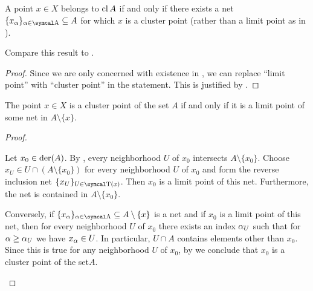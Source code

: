 \begin{proposition}
\begin{corollary}\label{thm:cluster_point_iff_in_closure}
  A point \( x \in X \) belongs to \( \operatorname{cl}{A} \) if and only if there exists a net \( \{ x_\al \}_{\al \in \CA} \subseteq A \) for which \( x \) is a cluster point (rather than a limit point as in ).

  Compare this result to .
\end{corollary}
\begin{proof}
  Since we are only concerned with existence in , we can replace \enquote{limit point} with \enquote{cluster point} in the statement. This is justified by .
\end{proof}

\begin{proposition}\label{thm:cluster_point_of_set_iff_limit_point_of_net}
  The point \( x \in X \) is a cluster point of the set \( A \) if and only if it is a limit point of some net in \( A \setminus \{ x \} \).
\end{proposition}
\begin{proof}\mbox{}
  \begin{description}
    \Implies Let \( x_0 \in \operatorname{der}(A) \). By , every neighborhood \( U \) of \( x_0 \) intersects \( A \setminus \{ x_0 \} \). Choose\LEM \( x_U \in U \cap (A \setminus \{ x_0 \}) \) for every neighborhood \( U \) of \( x_0 \) and form the reverse inclusion net \( \{ x_U \}_{U \in \CT(x)} \). Then \( x_0 \) is a limit point of this net. Furthermore, the net is contained in \( A \setminus \{ x_0 \} \).

    \ImpliedBy Conversely, if \( \{ x_\al \}_{\al \in \CA} \subseteq A \setminus \{ x \} \) is a net and if \( x_0 \) is a limit point of this net, then for every neighborhood \( U \) of \( x_0 \) there exists an index \( \alpha_U \) such that for \( \alpha \geq \alpha_U \) we have \(  x_\alpha \in U \). In particular, \( U \cap A \) contains elements other than \( x_0 \). Since this is true for any neighborhood \( U \) of \( x_0 \), by  we conclude that \( x_0 \) is a cluster point of the set\( A \).
  \end{description}
\end{proof}


\end{proposition}
